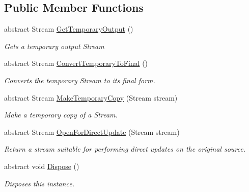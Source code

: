 \subsection*{Public Member Functions}
\begin{DoxyCompactItemize}
\item 
abstract Stream \hyperlink{class_i_c_sharp_code_1_1_sharp_zip_lib_1_1_zip_1_1_base_archive_storage_a1327afcc22749a88959c9d8614cf4c75}{Get\+Temporary\+Output} ()
\begin{DoxyCompactList}\small\item\em Gets a temporary output Stream \end{DoxyCompactList}\item 
abstract Stream \hyperlink{class_i_c_sharp_code_1_1_sharp_zip_lib_1_1_zip_1_1_base_archive_storage_ab20872fd7a5c31f1765bc36f3a37040f}{Convert\+Temporary\+To\+Final} ()
\begin{DoxyCompactList}\small\item\em Converts the temporary Stream to its final form. \end{DoxyCompactList}\item 
abstract Stream \hyperlink{class_i_c_sharp_code_1_1_sharp_zip_lib_1_1_zip_1_1_base_archive_storage_a3580cacd0a0e6b3045bdeeaed72cb492}{Make\+Temporary\+Copy} (Stream stream)
\begin{DoxyCompactList}\small\item\em Make a temporary copy of a Stream. \end{DoxyCompactList}\item 
abstract Stream \hyperlink{class_i_c_sharp_code_1_1_sharp_zip_lib_1_1_zip_1_1_base_archive_storage_a2e718c69eceae215d38d997e7b0d3693}{Open\+For\+Direct\+Update} (Stream stream)
\begin{DoxyCompactList}\small\item\em Return a stream suitable for performing direct updates on the original source. \end{DoxyCompactList}\item 
abstract void \hyperlink{class_i_c_sharp_code_1_1_sharp_zip_lib_1_1_zip_1_1_base_archive_storage_a570815be2a90ac68ada8a48eb4f5415b}{Dispose} ()
\begin{DoxyCompactList}\small\item\em Disposes this instance. \end{DoxyCompactList}\end{DoxyCompactItemize}
